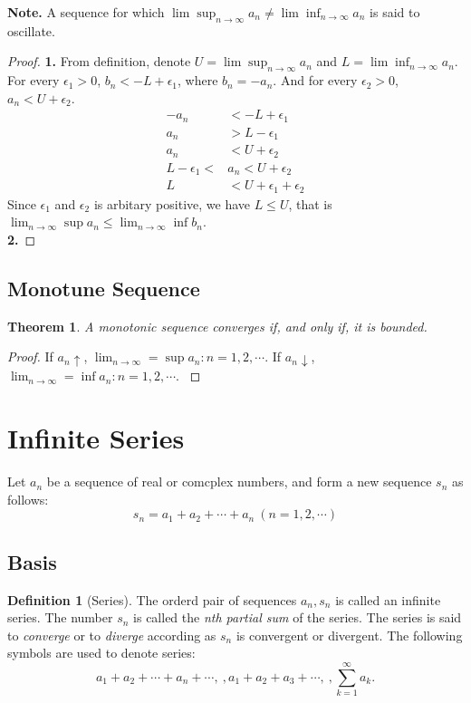 \documentclass{article}
\newtheorem{theorem}{Theorem}[section]
\theoremstyle{definition}
\newtheorem{defi}{Definition}[section]
\begin{document}
\textbf{Note.} A sequence for which $\lim\sup_{n\rightarrow \infty}a_{n}\neq\lim\inf_{n\rightarrow \infty}a_{n} $ is said to oscillate.\\
\begin{proof}
\textbf{1.}
From definition, denote $U=\lim\sup_{n\rightarrow \infty}a_{n}$ and $L=\lim\inf_{n\rightarrow \infty}a_{n}$.
For every $\epsilon_{1}>0$, $b_{n}<-L+\epsilon_{1}$, where $b_{n}=-a_{n}$. And for every $\epsilon_{2}>0$, $a_{n}<U+\epsilon_{2}$.
\begin{align*}
    -a_{n} &< -L + \epsilon_{1} \\
    a_{n} &> L - \epsilon_{1} \\
    a_{n} &< U + \epsilon_{2} \\
    L - \epsilon_{1} < &a_{n} < U + \epsilon_{2} \\
    L &< U + \epsilon_{1} + \epsilon_{2}
\end{align*}
Since $\epsilon_{1}$ and $\epsilon_{2}$ is arbitary positive, 
we have $L\leq U$, that is $\lim_{n\rightarrow \infty}\sup a_{n}\leq\lim_{n\rightarrow \infty}\inf b_{n}$.\\
\textbf{2.}


\end{proof}

\subsection{Monotune Sequence}
\begin{theorem}
    A monotonic sequence converges if, and only if, it is bounded.
\end{theorem}
\begin{proof}
    If $a_{n}\uparrow$, $\lim_{n\rightarrow \infty}=\sup {a_{n}:n=1,2,\cdots}.$ If 
    $a_{n}\downarrow$, $\lim_{n\rightarrow \infty}=\inf {a_{n}:n=1,2,\cdots}.$
\label{thm:monotoinc}
\end{proof}


\section{Infinite Series}
Let ${a_{n}}$ be a sequence of real or comcplex
numbers, and form a new sequence ${s_{n}}$ as follows:
$$s_{n}=a_{1}+a_{2}+\cdots +a_{n}\ (n=1,2,\cdots)$$

\subsection{Basis}
\begin{defi}[Series]
The orderd pair of sequences ${a_{n}},{s_{n}}$ is 
called an infinite series. The number $s_{n}$ is called 
the \textit{nth partial sum} of the series. The series is said 
to \textit{converge} or to \textit{diverge} according 
as ${s_{n}}$ is convergent or divergent. The following 
symbols are used to denote series:
$$a_{1}+a_{2}+\cdots +a_{n}+\cdots,\ ,a_{1}+a_{2}+a_{3}+\cdots,\ ,\sum_{k=1}^{\infty}a_{k}.$$
\end{defi}
\end{document}
